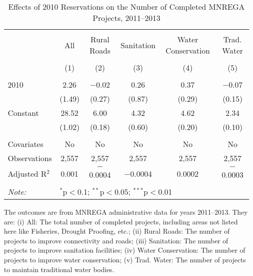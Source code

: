 \begin{table}[!htbp]
\centering
\begin{threeparttable}

  \caption{Effects of 2010 Reservations on the Number of Completed MNREGA Projects, 2011--2013} 
  \label{main_mnrega_10} 
\scriptsize 
\begin{tabular}{@{\extracolsep{0pt}}lccccc} 
\\[-1.8ex]\hline 
\hline \\[-1.8ex] 
 & All & Rural Roads & Sanitation & Water Conservation & Trad. Water \\ 
\\[-1.8ex] & (1) & (2) & (3) & (4) & (5)\\ 
\hline \\[-1.8ex] 
 2010 & 2.26 & $-$0.02 & 0.26 & 0.37 & $-$0.07 \\ 
  & (1.49) & (0.27) & (0.87) & (0.29) & (0.15) \\ 
  Constant & 28.52 & 6.00 & 4.32 & 4.62 & 2.34 \\ 
  & (1.02) & (0.18) & (0.60) & (0.20) & (0.10) \\ 
 \hline \\[-1.8ex] 
Covariates & No & No & No & No & No \\ 
Observations & 2,557 & 2,557 & 2,557 & 2,557 & 2,557 \\ 
Adjusted R$^{2}$ & 0.001 & $-$0.0004 & $-$0.0004 & 0.0002 & $-$0.0003 \\ 
\hline 
\hline \\[-1.8ex] 
\textit{Note:}  & \multicolumn{5}{l}{$^{*}$p$<$0.1; $^{**}$p$<$0.05; $^{***}$p$<$0.01} \\ 
\end{tabular} 
\begin{tablenotes}[flushleft]
\scriptsize
\item The outcomes are from MNREGA administrative data for years 2011--2013. They are: 
(i) All: The total number of completed projects, including areas not listed here like Fisheries, Drought Proofing, etc.;
(ii) Rural Roads: The number of projects to improve connectivity and roads;
(iii) Sanitation: The number of projects to improve sanitation facilities;
(iv) Water Conservation: The number of projects to improve water conservation;
(v) Trad. Water: The number of projects to maintain traditional water bodies.
\end{tablenotes}
\end{threeparttable}
\end{table}
